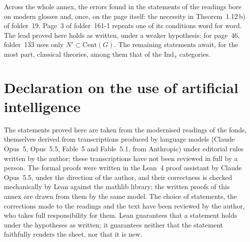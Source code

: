 \documentclass[11pt]{article}
\theoremstyle{plain}
\theoremstyle{definition}
\theoremstyle{remark}
\begin{document}
Across the whole annex, the errors found in the statements of the readings bore on modern glosses and, once, on the page itself: the necessity in Theorem~1.12\,b) of folder~19. Page~3 of folder~161-1 repeats one of its conditions word for word. The lead proved here holds as written, under a weaker hypothesis: for page~46, folder~133 uses only $N' \subset \mathrm{Cent}(G)$. The remaining statements await, for the most part, classical theories, among them that of the $\mathrm{Ind}_\pi$ categories.

\section*{Declaration on the use of artificial intelligence}

The statements proved here are taken from the modernised readings of the fonds, themselves derived from transcriptions produced by language models (Claude Opus~5, Opus~5.5, Fable~5 and Fable~5.1, from Anthropic) under editorial rules written by the author; these transcriptions have not been reviewed in full by a person. The formal proofs were written in the Lean~4 proof assistant by Claude Opus~5.5, under the direction of the author, and their correctness is checked mechanically by Lean against the mathlib library; the written proofs of this annex are drawn from them by the same model. The choice of statements, the corrections made to the readings and the text have been reviewed by the author, who takes full responsibility for them. Lean guarantees that a statement holds under the hypotheses as written; it guarantees neither that the statement faithfully renders the sheet, nor that it is new.
\end{document}
